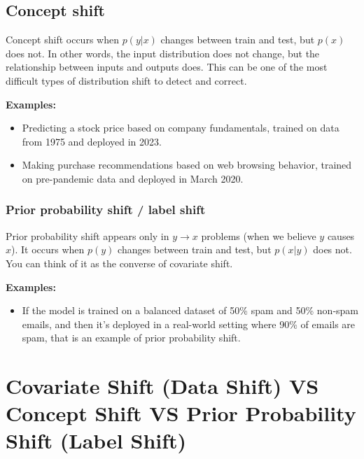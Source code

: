\subsection{Concept shift}\label{Concept shift}
Concept shift occurs when $p(y|x)$ changes between train and test, but $p(x)$ does not. In other words, the input distribution does not change, but the relationship between inputs and outputs does. This can be one of the most difficult types of distribution shift to detect and correct.

\vspace{0.2cm}
\textbf{Examples:}
\begin{itemize}
    \item Predicting a stock price based on company fundamentals, trained on data from 1975 and deployed in 2023.
    \item Making purchase recommendations based on web browsing behavior, trained on pre-pandemic data and deployed in March 2020.
\end{itemize}

\subsubsection{Prior probability shift / label shift}\label{Prior probability shift / label shift}
Prior probability shift appears only in $y \to x$ problems (when we believe $y$ causes $x$). It occurs when $p(y)$ changes between train and test, but $p(x|y)$ does not. You can think of it as the converse of covariate shift.

\vspace{0.2cm}
\textbf{Examples:}
\begin{itemize}
    \item If the model is trained on a balanced dataset of 50\% spam and 50\% non-spam emails, and then it’s deployed in a real-world setting where 90\% of emails are spam, that is an example of prior probability shift.
\end{itemize}

\section{Covariate Shift (Data Shift) VS Concept Shift VS Prior Probability Shift (Label Shift) \cite{chatgpt}}


